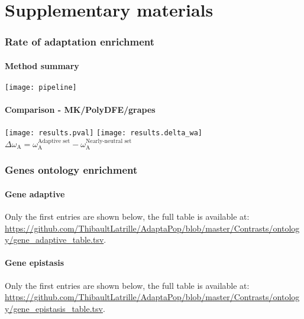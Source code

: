 \documentclass{article}
\begin{document}
\part*{Supplementary materials}
\tableofcontents
 
\pagebreak

\section{Rate of adaptation enrichment}
\subsection{Method summary}

\begin{center}
    \texttt{[image: pipeline]}
\end{center}

\subsection{Comparison - MK/PolyDFE/grapes}

\begin{center}
    \texttt{[image: results.pval]}
    \texttt{[image: results.delta\_wa]} \\
    $\Delta \omega_{\text{A}} = \omega_{\text{A}}^{\text{Adaptive set}} - \omega_{\text{A}}^{\text{Nearly-neutral set}}$
\end{center}



\section{Genes ontology enrichment}

\subsection{Gene adaptive}
Only the first entries are shown below, the full table is available at:
\url{https://github.com/ThibaultLatrille/AdaptaPop/blob/master/Contrasts/ontology/gene_adaptive_table.tsv}.


\subsection{Gene epistasis}
Only the first entries are shown below, the full table is available at:
\url{https://github.com/ThibaultLatrille/AdaptaPop/blob/master/Contrasts/ontology/gene_epistasis_table.tsv}.
\end{document}
